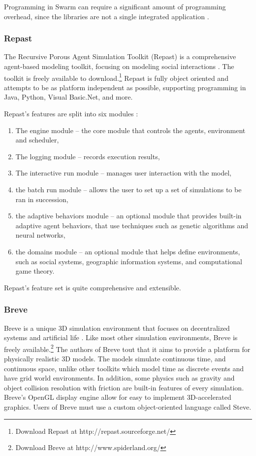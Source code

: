 Programming in Swarm can require a significant amount of programming overhead, since the libraries are not a single integrated application \cite{kleinbreve}.

\subsubsection{Repast}
The Recursive Porous Agent Simulation Toolkit (Repast) is a comprehensive agent-based modeling toolkit, focusing on modeling social interactions \cite{collier2003ref}.
The toolkit is freely available to download.\footnote{Download Repast at http://repast.sourceforge.net/}
Repast is fully object oriented and attempts to be as platform independent as possible, supporting programming in Java, Python, Visual Basic.Net, and more.

Repast's features are split into six modules \cite{north2006experiences}:
\begin{enumerate}
   \item The engine module -- the core module that controls the agents, environment and scheduler,
   \item The logging module -- records execution results,
   \item The interactive run module -- manages user interaction with the model,
   \item the batch run module -- allows the user to set up a set of simulations to be ran in succession,
   \item the adaptive behaviors module -- an optional module that provides built-in adaptive agent behaviors, that use techniques such as genetic algorithms and neural networks,
   \item the domains module -- an optional module that helps define environments, such as social systems, geographic information systems, and computational game theory.
\end{enumerate}
Repast's feature set is quite comprehensive and extensible.
   
\subsubsection{Breve}
Breve is a unique 3D simulation environment that focuses on decentralized systems and artificial life \cite{kleinbreve}.
Like most other simulation environments, Breve is freely available.\footnote{Download Breve at http://www.spiderland.org/}
The authors of Breve tout that it aims to provide a platform for physically realistic 3D models.
The models simulate continuous time, and continuous space, unlike other toolkits which model time as discrete events and have grid world environments.
In addition, some physics such as gravity and object collision resolution with friction are built-in features of every simulation.
Breve's OpenGL display engine allow for easy to implement 3D-accelerated graphics.
Users of Breve must use a custom object-oriented language called Steve.


